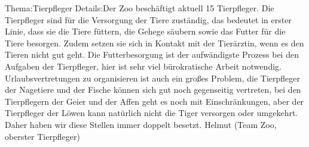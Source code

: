
%
	{Thema:}{Tierpfleger}%
	{Details:}{Der Zoo beschäftigt aktuell 15 Tierpfleger. Die Tierpfleger sind für die Versorgung der Tiere zuständig, das bedeutet in erster Linie, dass sie die Tiere füttern, die Gehege säubern sowie das Futter für die Tiere besorgen. Zudem setzen sie sich in Kontakt mit der Tierärztin, wenn es den Tieren nicht gut geht. Die Futterbesorgung ist der aufwändigste Prozess bei den Aufgaben der Tierpfleger, hier ist sehr viel bürokratische Arbeit notwendig. Urlaubsvertretungen zu organisieren ist auch ein großes Problem, die Tierpfleger der Nagetiere und der Fische können sich gut noch gegenseitig vertreten, bei den Tierpflegern der Geier und der Affen geht es noch mit Einschränkungen, aber der Tierpfleger der Löwen kann natürlich nicht die Tiger versorgen oder umgekehrt. Daher haben wir diese Stellen immer doppelt besetzt.}%
	{Helmut (Team Zoo, oberster Tierpfleger)}

